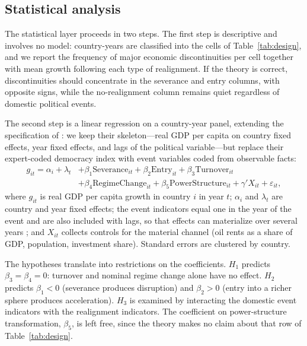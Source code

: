 \documentclass[11pt]{article}
\begin{document}
\subsection{Statistical analysis}

The statistical layer proceeds in two steps. The first step is descriptive and involves no model: country-years are classified into the cells of Table~\ref{tab:design}, and we report the frequency of major economic discontinuities per cell together with mean growth following each type of realignment. If the theory is correct, discontinuities should concentrate in the severance and entry columns, with opposite signs, while the no-realignment column remains quiet regardless of domestic political events.

The second step is a linear regression on a country-year panel, extending the specification of \textcite{acemoglu_naidu_restrepo_robinson_2019}: we keep their skeleton---real GDP per capita on country fixed effects, year fixed effects, and lags of the political variable---but replace their expert-coded democracy index with event variables coded from observable facts:
\begin{equation}
\begin{split}
g_{it} = \alpha_i + \lambda_t &+ \beta_1 \mathrm{Severance}_{it} + \beta_2 \mathrm{Entry}_{it} + \beta_3 \mathrm{Turnover}_{it} \\
&+ \beta_4 \mathrm{RegimeChange}_{it} + \beta_5 \mathrm{PowerStructure}_{it} + \gamma' X_{it} + \varepsilon_{it},
\end{split}
\label{eq:main}
\end{equation}
where $g_{it}$ is real GDP per capita growth in country $i$ in year $t$; $\alpha_i$ and $\lambda_t$ are country and year fixed effects; the event indicators equal one in the year of the event and are also included with lags, so that effects can materialize over several years \parencite{acemoglu_naidu_restrepo_robinson_2019}; and $X_{it}$ collects controls for the material channel (oil rents as a share of GDP, population, investment share). Standard errors are clustered by country.

The hypotheses translate into restrictions on the coefficients. $H_1$ predicts $\beta_3 = \beta_4 = 0$: turnover and nominal regime change alone have no effect. $H_2$ predicts $\beta_1 < 0$ (severance produces disruption) and $\beta_2 > 0$ (entry into a richer sphere produces acceleration). $H_3$ is examined by interacting the domestic event indicators with the realignment indicators. The coefficient on power-structure transformation, $\beta_5$, is left free, since the theory makes no claim about that row of Table~\ref{tab:design}.
\end{document}
